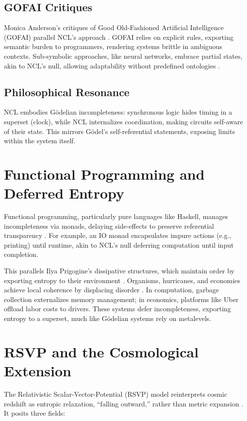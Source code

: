 \documentclass{article}
\begin{document}
\subsection{GOFAI Critiques}
Monica Anderson's critiques of Good Old-Fashioned Artificial Intelligence (GOFAI) parallel NCL's approach \citep{anderson2006}. GOFAI relies on explicit rules, exporting semantic burden to programmers, rendering systems brittle in ambiguous contexts. Sub-symbolic approaches, like neural networks, embrace partial states, akin to NCL's null, allowing adaptability without predefined ontologies \citep{clark2013, hohwy2013}.

\subsection{Philosophical Resonance}
NCL embodies Gödelian incompleteness: synchronous logic hides timing in a superset (clock), while NCL internalizes coordination, making circuits self-aware of their state. This mirrors Gödel's self-referential statements, exposing limits within the system itself.

\section{Functional Programming and Deferred Entropy}
\label{sec:programming_entropy}
Functional programming, particularly pure languages like Haskell, manages incompleteness via monads, delaying side-effects to preserve referential transparency \citep{wadler1992, turner1979}. For example, an IO monad encapsulates impure actions (e.g., printing) until runtime, akin to NCL's null deferring computation until input completion.

This parallels Ilya Prigogine's dissipative structures, which maintain order by exporting entropy to their environment \citep{prigogine1984, nicolis1977}. Organisms, hurricanes, and economies achieve local coherence by displacing disorder \citep{schneider2005}. In computation, garbage collection externalizes memory management; in economics, platforms like Uber offload labor costs to drivers. These systems defer incompleteness, exporting entropy to a superset, much like Gödelian systems rely on metalevels.

\section{RSVP and the Cosmological Extension}
\label{sec:rsvp}
The Relativistic Scalar-Vector-Potential (RSVP) model reinterprets cosmic redshift as entropic relaxation, ``falling outward,'' rather than metric expansion \citep{whittle2015}. It posits three fields:
\end{document}
